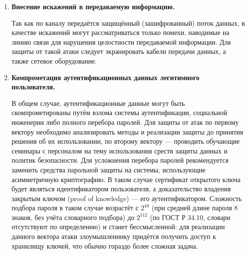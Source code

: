 \begin{enumerate} [label=\textbf{\arabic*}. ]
	\nopagebreak
	Защитой от нелегитимного копирования электронных документов является любое средство защиты информации от НСД --- например, средство шифрования данных в локальном хранилище, средство защиты каналов передачи данных, и т.п. Дополнительным уровнем защиты, применимым также для противодействия внутренним угрозам, является специальное программное обеспечение для чтения документов. Например, вместо предоставления документов по запросу можно предоставлять доступ к удалённому средству просмотра (например, через веб в защищённой сессии) без возможности локального копирования документов. Для полной защиты необходимо также ограничить круг терминалов удалённого доступа и запретить на них скриншоты (снимки экрана). В случае, если помимо просмотра документа требуется и его редактирование, такое приложение должно предоставлять и данный сервис.

	\item \textbf{Внесение искажений в передаваемую информацию.}

	\nopagebreak
	Так как по каналу передаётся защищённый (зашифрованный) поток данных, в качестве искажений могут рассматриваться только помехи, наводимые на линию связи для нарушения целостности передаваемой информации. Для защиты от такой атаки следует экранировать кабели передачи данных, а также сетевое оборудование.

	\item \textbf{Компрометация аутентификационных данных легитимного пользователя.}

	\nopagebreak
	В общем случае, аутентификационные данные могут быть скомпрометированы путём взлома системы аутентификации, социальной инженерии либо полного перебора паролей. Для защиты от атак по первому вектору необходимо анализировать методы и реализации защиты до принятия решения об их использовании, по второму вектору --- проводить обучающие семинары с персоналом на тему использования среств защиты данных и политик безопасности. Для усложнения перебора паролей рекомендуется заменить средства парольной защиты на системы, использующие асимметричную криптографию. В таком случае сертификат открытого ключа будет являться идентификатором пользователя, а доказательство владения закрытым ключом (proof of knowledge) --- его аутентификатором. Сложность подбора пароля в таком случае возрастёт с $2^{48}$ (при средней длине пароля 8 знаков, без учёта словарного подбора) до $2^{512}$ (по ГОСТ Р 34.10, словари отсутствуют по определению) и станет бессмысленной: для реализации данного вектора атаки злоумышленнику придётся получить доступ к хранилищу ключей, что обычно гораздо более сложная задача.


\end{enumerate}
